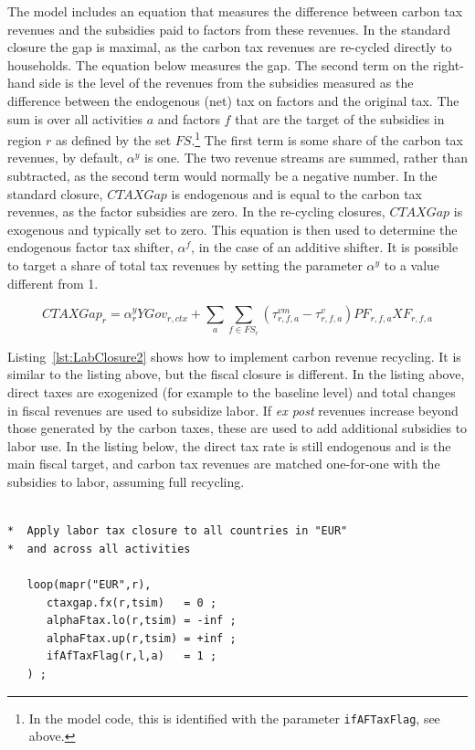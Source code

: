 \documentclass[11pt,letterpaper]{report}
\begin{document}
The model includes an equation that measures the
difference between carbon tax revenues and the subsidies paid to
factors from these revenues. In the standard closure the
gap is maximal, as the carbon tax revenues are re-cycled
directly to households. The equation below measures the gap.
The second term on the right-hand side is the level of the revenues
from the subsidies measured as the difference between the endogenous
(net) tax on factors and the original tax. The sum is over all
activities $a$ and factors $f$ that are the target of the subsidies
in region $r$ as defined by the set $\mathit{FS}$.\footnote{In the
model code, this is identified with the parameter \texttt{ifAFTaxFlag}, see
above.} The first term is some share of the carbon tax revenues, by
default, $\alpha^y$ is one. The two revenue streams are summed, rather
than subtracted, as the second term would normally be a negative number.
In the standard closure, $\mathit{CTAXGap}$ is endogenous and is
equal to the carbon tax revenues, as the factor subsidies are zero.
In the re-cycling closures, $\mathit{CTAXGap}$ is exogenous and typically
set to zero. This equation is then used to determine the endogenous
factor tax shifter, $\alpha^f$, in the case of an additive shifter. It is
possible to target a share of total tax revenues by setting the
parameter $\alpha^y$ to a value different from 1.

\[
\mathit{CTAXGap}_{r} = \alpha^y_{r} \mathit{YGov}_{r,\mathit{ctx}}
+ \sum_a{\sum_{f \in \mathit{FS}_r}{ \left(\tau^{\mathit{vm}}_{r,f,a} - \tau^{\mathit{v}}_{r,f,a}\right)
\mathit{PF}_{r,f,a} \mathit{XF}_{r,f,a}}}
\]

Listing~\ref{lst:LabClosure2} shows how to implement carbon revenue recycling. It is
similar to the listing above, but the fiscal closure is different. In the listing
above, direct taxes are exogenized (for example to the baseline level) and total changes
in fiscal revenues are used to subsidize labor. If \emph{ex post} revenues increase beyond
those generated by the carbon taxes, these are used to add additional subsidies to labor use.
In the listing below, the direct tax rate is still endogenous and is the main fiscal target, and
carbon tax revenues are matched one-for-one with the subsidies to labor, assuming full
recycling.

\begin{lstlisting}[language=GAMS,
	caption={Carbon tax recycling to lower tax on labor}, label=lst:LabClosure2]

*  Apply labor tax closure to all countries in "EUR"
*  and across all activities

   loop(mapr("EUR",r),
      ctaxgap.fx(r,tsim)   = 0 ;
      alphaFtax.lo(r,tsim) = -inf ;
      alphaFtax.up(r,tsim) = +inf ;
      ifAfTaxFlag(r,l,a)   = 1 ;
   ) ;

\end{lstlisting}
\end{document}
